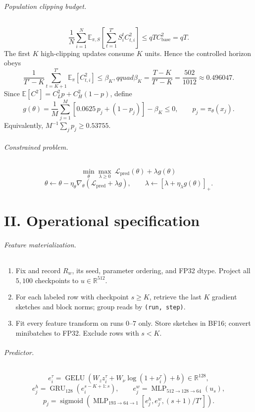 \documentclass[10pt]{article}
\newcommand{\R}{\mathbb{R}}
\newcommand{\E}{\mathbb{E}}
\newcommand{\1}{\mathbf{1}}
\begin{document}
\paragraph{Population clipping budget.}
\[
\frac1N\sum_{i=1}^{N}\E_{\pi,S}
\left[\sum_{t=1}^{T'}S_i^tC_{t,i}^2\right]
\le qT C_{\mathrm{base}}^2=qT.
\]
The first $K$ high-clipping updates consume $K$ units. Hence the controlled
horizon obeys
\[
\frac{1}{T'-K}\sum_{t=K+1}^{T'}\E_\pi[C_{t,i}^2]
\le\beta_K,qquad
\beta_K=\frac{T-K}{T'-K}=\frac{502}{1012}\approx0.496047.
\]
Since $\E[C^2]=C_L^2p+C_H^2(1-p)$, define
\[
g(\theta)=\frac1M\sum_{j=1}^{M}
\left[0.0625\,p_j+(1-p_j)\right]-\beta_K\le0,
\qquad p_j=\pi_\theta(x_j).
\]
Equivalently, $M^{-1}\sum_jp_j\ge0.53755$.

\paragraph{Constrained problem.}
\[
\boxed{
\min_\theta\max_{\lambda\ge0}
\ \mathcal L_{\mathrm{pred}}(\theta)+\lambda g(\theta)
}
\]
\[
\theta\leftarrow\theta-\eta_\theta\nabla_\theta
\left(\mathcal L_{\mathrm{pred}}+\lambda g\right),
\qquad
\lambda\leftarrow\left[\lambda+\eta_\lambda g(\theta)\right]_+.
\]

\part*{II. Operational specification}

\paragraph{Feature materialization.}
\begin{enumerate}
  \item Fix and record $R_w$, its seed, parameter ordering, and FP32 dtype.
  Project all $5{,}100$ checkpoints to $u\in\R^{512}$.
  \item For each labeled row with checkpoint $s\ge K$, retrieve the last $K$
  gradient sketches and block norms; group reads by \texttt{(run, step)}.
  \item Fit every feature transform on runs $0$--$7$ only. Store sketches in
  BF16; convert minibatches to FP32. Exclude rows with $s<K$.
\end{enumerate}

\paragraph{Predictor.}
\[
e_i^\tau=\operatorname{GELU}
\left(W_z z_i^\tau+W_\nu\log(1+\nu_i^\tau)+b\right)\in\R^{128},
\]
\[
e_j^h=\operatorname{GRU}_{128}(e_i^{s-K+1:s}),\qquad
e_j^w=\operatorname{MLP}_{512\to128\to64}(u_s),
\]
\[
p_j=\operatorname{sigmoid}\!\left(
\operatorname{MLP}_{193\to64\to1}
[e_j^h,e_j^w,(s+1)/T']\right).
\]
\end{document}
